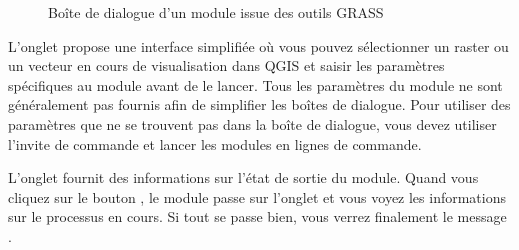 \begin{figure}[h]
\centering
\caption{Boîte de dialogue d'un module issue des outils GRASS \nixcaption}\label{fig:grass_module_dialog}
   \goodgap
   \goodgap
\end{figure}


L'onglet  propose une interface simplifiée où vous pouvez sélectionner un raster ou un vecteur en cours de visualisation dans QGIS et
saisir les paramètres spécifiques au module avant de le lancer. Tous les paramètres du module ne sont généralement pas fournis afin de simplifier
les boîtes de dialogue. Pour utiliser des paramètres que ne se trouvent pas dans la boîte de dialogue, vous devez utiliser l'invite de commande
et lancer les modules en lignes de commande.


L'onglet  fournit des informations sur l'état de sortie du module. Quand vous cliquez sur le bouton , le module passe sur l'onglet  et vous voyez les informations sur le processus en cours. Si tout se passe bien, vous verrez finalement le message .

